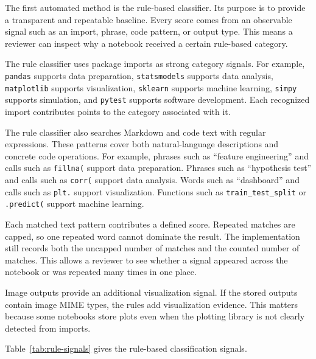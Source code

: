 The first automated method is the rule-based classifier. Its purpose is to provide a transparent and repeatable baseline. Every score comes from an observable signal such as an import, phrase, code pattern, or output type. This means a reviewer can inspect why a notebook received a certain rule-based category.

The rule classifier uses package imports as strong category signals. For example, \texttt{pandas} supports data preparation, \texttt{statsmodels} supports data analysis, \texttt{matplotlib} supports visualization, \texttt{sklearn} supports machine learning, \texttt{simpy} supports simulation, and \texttt{pytest} supports software development. Each recognized import contributes points to the category associated with it.

The rule classifier also searches Markdown and code text with regular expressions. These patterns cover both natural-language descriptions and concrete code operations. For example, phrases such as ``feature engineering'' and calls such as \texttt{fillna(} support data preparation. Phrases such as ``hypothesis test'' and calls such as \texttt{corr(} support data analysis. Words such as ``dashboard'' and calls such as \texttt{plt.} support visualization. Functions such as \texttt{train\_test\_split} or \texttt{.predict(} support machine learning.

Each matched text pattern contributes a defined score. Repeated matches are capped, so one repeated word cannot dominate the result. The implementation still records both the uncapped number of matches and the counted number of matches. This allows a reviewer to see whether a signal appeared across the notebook or was repeated many times in one place.

Image outputs provide an additional visualization signal. If the stored outputs contain image MIME types, the rules add visualization evidence. This matters because some notebooks store plots even when the plotting library is not clearly detected from imports.

Table~\ref{tab:rule-signals} gives the rule-based classification signals.

